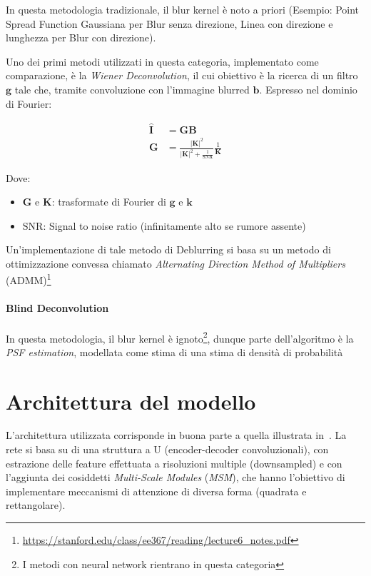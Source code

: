 \documentclass[a4paper,10pt,twocolumn]{article}
\begin{document}
In questa metodologia tradizionale, il blur kernel \`e noto a priori (Esempio: Point Spread Function Gaussiana per Blur senza direzione, Linea con direzione e lunghezza per Blur con direzione).\par
Uno dei primi metodi utilizzati in questa categoria, implementato come comparazione, \`e la \textit{Wiener Deconvolution}, il cui obiettivo \`e la ricerca di un filtro $\bm{g}$ tale che, tramite
convoluzione con l'immagine blurred $\bm{b}$. Espresso nel dominio di Fourier:

\begin{align}
  \hat{\bm{I}} &= \bm{G}\bm{B} \\
  \bm{G}       &= \frac{|\bm{K}|^2}{|\bm{K}|^2+\frac{1}{\mathrm{SNR}}} \frac{1}{\bm{K}}
\end{align}

Dove:

\begin{itemize}[topsep=0pt, noitemsep]
  \item[] $\bm{G}$ e $\bm{K}$: trasformate di Fourier di $\bm{g}$ e $\bm{k}$
  \item[] $\mathrm{SNR}$: Signal to noise ratio (infinitamente alto se rumore assente)
\end{itemize}

Un'implementazione di tale metodo di Deblurring si basa su un metodo di ottimizzazione convessa chiamato \textit{Alternating Direction Method of Multipliers} (ADMM)\footnote{\url{https://stanford.edu/class/ee367/reading/lecture6_notes.pdf}}

\paragraph*{Blind Deconvolution}

In questa metodologia, il blur kernel \`e ignoto\footnote{I metodi con neural network rientrano in questa categoria}, dunque parte dell'algoritmo \`e la \textit{PSF estimation}, modellata come
stima di una stima di densit\`a di probabilit\`a

\section{Architettura del modello}
L'architettura utilizzata corrisponde in buona parte a quella illustrata in~\cite{convir}. La rete si basa su di una struttura a U (encoder-decoder convoluzionali), con estrazione delle feature effettuata a risoluzioni multiple (downsampled)
e con l'aggiunta dei cosiddetti \textit{Multi-Scale Modules} (\textit{MSM}), che hanno l'obiettivo di implementare meccanismi di attenzione di diversa forma (quadrata e rettangolare).
\end{document}
